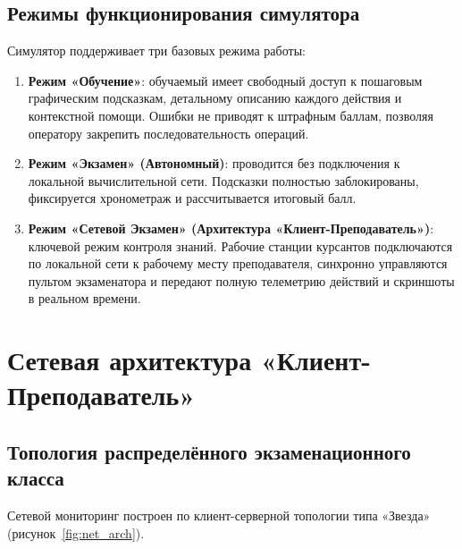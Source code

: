 \documentclass[12pt,a4paper]{report}
\begin{document}
\section{Режимы функционирования симулятора}
Симулятор поддерживает три базовых режима работы:
\begin{enumerate}
    \item \textbf{Режим «Обучение»}: обучаемый имеет свободный доступ к пошаговым графическим подсказкам, детальному описанию каждого действия и контекстной помощи. Ошибки не приводят к штрафным баллам, позволяя оператору закрепить последовательность операций.
    \item \textbf{Режим «Экзамен» (Автономный)}: проводится без подключения к локальной вычислительной сети. Подсказки полностью заблокированы, фиксируется хронометраж и рассчитывается итоговый балл.
    \item \textbf{Режим «Сетевой Экзамен» (Архитектура «Клиент-Преподаватель»)}: ключевой режим контроля знаний. Рабочие станции курсантов подключаются по локальной сети к рабочему месту преподавателя, синхронно управляются пультом экзаменатора и передают полную телеметрию действий и скриншоты в реальном времени.
\end{enumerate}

\chapter{Сетевая архитектура «Клиент-Преподаватель»}

\section{Топология распределённого экзаменационного класса}
Сетевой мониторинг построен по клиент-серверной топологии типа «Звезда» (рисунок~\ref{fig:net_arch}). 
\end{document}
